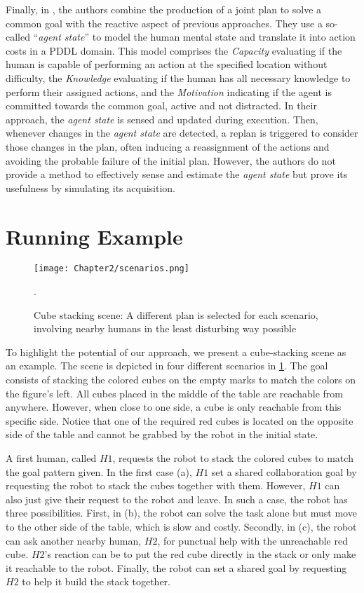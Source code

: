 Finally, in \cite{izquierdo_badiola_improved_2022}, the authors combine the production of a joint plan to solve a common goal with the reactive aspect of previous approaches. 
They use a so-called ``\textit{agent state}'' to model the human mental state and translate it into action costs in a PDDL domain. This model comprises the \textit{Capacity} evaluating if the human is capable of performing an action at the specified location without difficulty, the \textit{Knowledge} evaluating if the human has all necessary knowledge to perform their assigned actions, and the \textit{Motivation} indicating if the agent is committed towards the common goal, active and not distracted. 
In their approach, the \textit{agent state} is sensed and updated during execution. Then, whenever changes in the \textit{agent state} are detected, a replan is triggered to consider those changes in the plan, often inducing a reassignment of the actions and avoiding the probable failure of the initial plan. However, the authors do not provide a method to effectively sense and estimate the \textit{agent state} but prove its usefulness by simulating its acquisition.


\section{Running Example}

\begin{figure}
    \centering
    \texttt{[image: Chapter2/scenarios.png]}
    \caption{Cube stacking scene: A different plan is selected for each scenario, involving nearby humans in the least disturbing way possible}.
    \label{fig:scenarios}
\end{figure}

To highlight the potential of our approach, we present a cube-stacking scene as an example. The scene is depicted in four different scenarios in \ref{fig:scenarios}. The goal consists of stacking the colored cubes on the empty marks to match the colors on the figure's left. All cubes placed in the middle of the table are reachable from anywhere. However, when close to one side, a cube is only reachable from this specific side. Notice that one of the required red cubes is located on the opposite side of the table and cannot be grabbed by the robot in the initial state.

A first human, called $H1$, requests the robot to stack the colored cubes to match the goal pattern given. In the first case (a), $H1$ set a shared collaboration goal by requesting the robot to stack the cubes together with them. However, $H1$ can also just give their request to the robot and leave. In such a case, the robot has three possibilities. First, in (b), the robot can solve the task alone but must move to the other side of the table, which is slow and costly. Secondly, in (c), the robot can ask another nearby human, $H2$, for punctual help with the unreachable red cube. $H2$'s reaction can be to put the red cube directly in the stack or only make it reachable to the robot. Finally, the robot can set a shared goal by requesting $H2$ to help it build the stack together. 

